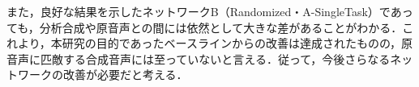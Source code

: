 また，良好な結果を示したネットワークB（Randomized・A-SingleTask）であっても，分析合成や原音声との間には依然として大きな差があることがわかる．これより，本研究の目的であったベースラインからの改善は達成されたものの，原音声に匹敵する合成音声には至っていないと言える．従って，今後さらなるネットワークの改善が必要だと考える．

\begin{table}[bt]
    \centering
    \caption{主観評価実験の結果より計算した標本平均と95\%信頼区間}
    \label{sec4:tab:sbj_mean_ci}
    \begin{center}
        \renewcommand{\arraystretch}{1.0} %
        \setlength{\tabcolsep}{8pt}      %
    \end{center}
\end{table}

